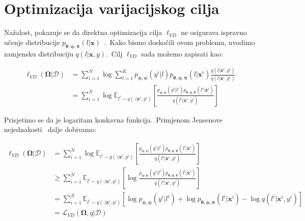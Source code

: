 \documentclass[diplomskirad]{fer}
\begin{document}
\section{Optimizacija varijacijskog cilja}
\label{sek:var_goal}

Nažalost, pokazuje se da direktna optimizacija cilja $\ell_{VD}$ ne osigurava ispravno učenje distribucije $p_{\bm{\theta}, \bm{\phi}, \bm{\pi}}(l | \bm{x})$~\cite{mclachlan2008algorithm}.\ 
Kako bismo doskočili ovom problemu, uvodimo zamjensku distribuciju $q(l | \bm{x}, y)$.\ Cilj $\ell_{VD}$ sada možemo zapisati kao:

\begin{equation}
  \begin{aligned}
    \ell_{VD}(\bm{\Omega}|\mathcal{D}) &= \sum_{i=1}^{N} \log \sum_{l=1}^{K} p_{\bm{\phi}, \bm{\psi}}(y^i | l) p_{\bm{\theta}, \bm{\phi}, \bm{\pi}}(l | \bm{x}^i) \frac{q(l | \bm{x}^i, y^i)}{q(l | \bm{x}^i, y^i)} \\
                                 &= \sum_{i=1}^{N} \log \mathbb{E}_{l^i \sim q(\cdot | \bm{x}^i, y^i)} \left[ \frac{p_{\bm{\phi}, \bm{\psi}}(y^i | l^i) p_{\bm{\theta}, \bm{\phi}, \bm{\pi}}(l^i | \bm{x}^i)}{q(l^i | \bm{x}^i, y^i)} \right]
  \end{aligned}
  \label{eq:vibe_added_q}
\end{equation}

Prisjetimo se da je logaritam konkavna funkcija.\ Primjenom Jensenove nejednakosti~\cite{mcshane1937jensen} dalje dobivamo:

\begin{equation}
  \begin{aligned}
    \ell_{VD}(\bm{\Omega}|\mathcal{D}) &= \sum_{i=1}^{N} \log \mathbb{E}_{l^i \sim q(\cdot | \bm{x}^i, y^i)} \left[ \frac{p_{\bm{\phi}, \bm{\psi}}(y^i | l^i) p_{\bm{\theta}, \bm{\phi}, \bm{\pi}}(l^i | \bm{x}^i)}{q(l^i | \bm{x}^i, y^i)} \right] \\
                                 &\geq \sum_{i=1}^{N} \mathbb{E}_{l^i \sim q(\cdot | \bm{x}^i, y^i)} \left[\log \frac{p_{\bm{\phi}, \bm{\psi}}(y^i | l^i) p_{\bm{\theta}, \bm{\phi}, \bm{\pi}}(l^i | \bm{x}^i)}{q(l^i | \bm{x}^i, y^i)} \right] \\
                                 &= \sum_{i=1}^{N} \mathbb{E}_{l^i \sim q(\cdot | \bm{x}^i, y^i)} \left[\log p_{\bm{\phi}, \bm{\psi}}(y^i | l^i) + \log p_{\bm{\theta}, \bm{\phi}, \bm{\pi}}(l^i | \bm{x}^i) - \log q(l^i | \bm{x}^i, y^i) \right] \\
                                 &= \mathcal{L}_{VD}(\bm{\Omega}, q | \mathcal{D})
  \end{aligned}
  \label{eq:vibe_jensen}
\end{equation}
\end{document}

